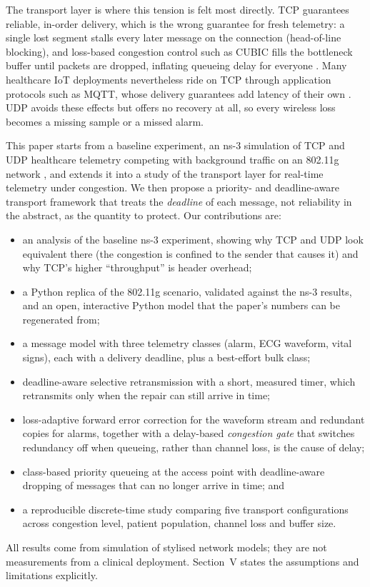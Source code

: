 \documentclass[10pt,twocolumn,letterpaper]{article}
\begin{document}
The transport layer is where this tension is felt most directly. TCP \cite{rfc9293} guarantees reliable, in-order delivery, which is the wrong guarantee for fresh telemetry: a single lost segment stalls every later message on the connection (head-of-line blocking), and loss-based congestion control such as CUBIC \cite{rfc9438} fills the bottleneck buffer until packets are dropped, inflating queueing delay for everyone \cite{livingood2022}. Many healthcare IoT deployments nevertheless ride on TCP through application protocols such as MQTT, whose delivery guarantees add latency of their own \cite{borsatti2020}. UDP avoids these effects but offers no recovery at all, so every wireless loss becomes a missing sample or a missed alarm.

This paper starts from a baseline experiment, an ns-3 simulation of TCP and UDP healthcare telemetry competing with background traffic on an 802.11g network \cite{repo,ns3}, and extends it into a study of the transport layer for real-time telemetry under congestion. We then propose a priority- and deadline-aware transport framework that treats the \emph{deadline} of each message, not reliability in the abstract, as the quantity to protect. Our contributions are:
\begin{itemize}
\item an analysis of the baseline ns-3 experiment, showing why TCP and UDP look equivalent there (the congestion is confined to the sender that causes it) and why TCP's higher ``throughput'' is header overhead;
\item a Python replica of the 802.11g scenario, validated against the ns-3 results, and an open, interactive Python model that the paper's numbers can be regenerated from;
\item a message model with three telemetry classes (alarm, ECG waveform, vital signs), each with a delivery deadline, plus a best-effort bulk class;
\item deadline-aware selective retransmission with a short, measured timer, which retransmits only when the repair can still arrive in time;
\item loss-adaptive forward error correction for the waveform stream and redundant copies for alarms, together with a delay-based \emph{congestion gate} that switches redundancy off when queueing, rather than channel loss, is the cause of delay;
\item class-based priority queueing at the access point with deadline-aware dropping of messages that can no longer arrive in time; and
\item a reproducible discrete-time study comparing five transport configurations across congestion level, patient population, channel loss and buffer size.
\end{itemize}
All results come from simulation of stylised network models; they are not measurements from a clinical deployment. Section~V states the assumptions and limitations explicitly.
\end{document}
